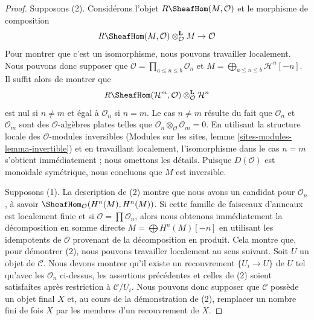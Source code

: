 \begin{proof}
Supposons (2). Considérons l'objet $R\SheafHom(M, \mathcal{O})$ et le
morphisme de composition
$$
R\SheafHom(M, \mathcal{O}) \otimes_\mathcal{O}^\mathbf{L} M \to \mathcal{O}
$$
Pour montrer que c'est un isomorphisme, nous pouvons travailler localement.
Nous pouvons donc supposer que
$\mathcal{O} = \prod_{a \leq n \leq b} \mathcal{O}_n$ et
$M = \bigoplus_{a \leq n \leq b} \mathcal{H}^n[-n]$. Il suffit alors de
montrer que
$$
R\SheafHom(\mathcal{H}^m, \mathcal{O})
\otimes_\mathcal{O}^\mathbf{L} \mathcal{H}^n
$$
est nul si $n \not = m$ et égal à $\mathcal{O}_n$ si $n = m$. Le cas
$n \not = m$ résulte du fait que $\mathcal{O}_n$ et $\mathcal{O}_m$ sont des
$\mathcal{O}$-algèbres plates telles que
$\mathcal{O}_n \otimes_\mathcal{O} \mathcal{O}_m = 0$. En utilisant la
structure locale des $\mathcal{O}$-modules inversibles (Modules sur les sites,
lemme \ref{sites-modules-lemma-invertible}) et en travaillant localement,
l'isomorphisme dans le cas $n = m$ s'obtient immédiatement ; nous omettons
les détails. Puisque $D(\mathcal{O})$ est monoïdale symétrique, nous concluons
que $M$ est inversible.

\medskip\noindent
Supposons (1). La description de (2) montre que nous avons un candidat pour
$\mathcal{O}_n$, à savoir
$\SheafHom_\mathcal{O}(H^n(M), H^n(M))$. Si cette famille de faisceaux
d'anneaux est localement finie et si
$\mathcal{O} = \prod \mathcal{O}_n$, alors nous obtenons immédiatement la
décomposition en somme directe $M = \bigoplus H^n(M)[-n]$ en utilisant les
idempotents de $\mathcal{O}$ provenant de la décomposition en produit. Cela
montre que, pour démontrer (2), nous pouvons travailler localement au sens
suivant. Soit $U$ un objet de $\mathcal{C}$. Nous devons montrer qu'il existe
un recouvrement $\{U_i \to U\}$ de $U$ tel qu'avec les $\mathcal{O}_n$
ci-dessus, les assertions précédentes et celles de (2) soient satisfaites
après restriction à $\mathcal{C}/U_i$. Nous pouvons donc supposer que
$\mathcal{C}$ possède un objet final $X$ et, au cours de la démonstration de
(2), remplacer un nombre fini de fois $X$ par les membres d'un recouvrement
de $X$.


\end{proof}
